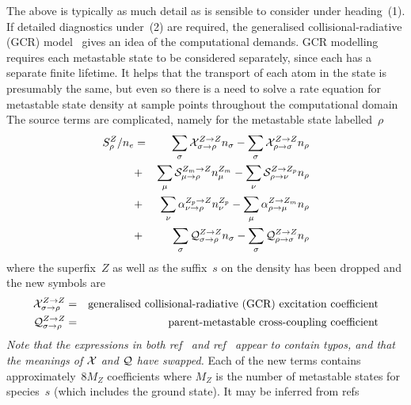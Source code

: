 The above is typically as much detail as is sensible to consider under heading~(1).
If detailed diagnostics under~(2) are required, the  generalised collisional-radiative (GCR) model~\cite{Ba03Diel}
gives an idea of the computational demands.
GCR modelling requires each metastable state to be considered separately, since each has a separate finite lifetime.
It helps that the transport of each atom in the state is presumably the same, but even so there is a need to
solve a rate equation for metastable state density at sample points throughout the computational domain
The source terms are complicated, namely for the metastable state labelled~$\rho$
\begin{eqnarray} \label{eq:nrhosource}
S_\rho^Z/n_e&=&\sum_\sigma \mathcal{X}_{\sigma \rightarrow \rho}^{Z\rightarrow Z}n_\sigma
-\sum_\sigma \mathcal{X}_{\rho \rightarrow \sigma}^{Z\rightarrow Z}n_\rho \\
&+&\sum_\mu \mathcal{S}_{\mu \rightarrow \rho}^{Z_m\rightarrow Z}n^{Z_m}_\mu
-\sum_\nu \mathcal{S}_{\rho \rightarrow \nu}^{Z\rightarrow Z_p}n_\rho  \\
&+&\sum_\nu \alpha_{\nu \rightarrow \rho}^{Z_p\rightarrow Z}n^{Z_p}_\nu
-\sum_\mu \alpha_{\rho \rightarrow \mu}^{Z\rightarrow Z_m}n_\rho \\
&+&\sum_\sigma \mathcal{Q}_{\sigma \rightarrow \rho}^{Z\rightarrow Z}n_\sigma
-\sum_\sigma \mathcal{Q}_{\rho \rightarrow \sigma}^{Z\rightarrow Z}n_\rho 
\end{eqnarray}
where the superfix~$Z$ as well as the suffix~$s$ on the density has been dropped
and the new symbols are
\begin{eqnarray}
\mathcal{X}_{\sigma \rightarrow \rho}^{Z\rightarrow Z} &=&\mbox{generalised collisional-radiative (GCR) excitation coefficient} \\
\mathcal{Q}_{\sigma \rightarrow \rho}^{Z\rightarrow Z} &=&\mbox{parent-metastable cross-coupling coefficient}
\end{eqnarray}
\emph{Note that the expressions in both ref~\cite[eq.\ (9)]{Ba03Diel} and ref~\cite[slide 41]{omullane}
appear to contain typos, and that the meanings of $\mathcal{X}$ and $\mathcal{Q}$ have swapped.}
Each of the new terms contains approximately~$8M_Z$ coefficients where $M_Z$ is the number of metastable
states for species~$s$ (which includes the ground state). It may be inferred from refs~\cite{omullane,Su06ADAS}
